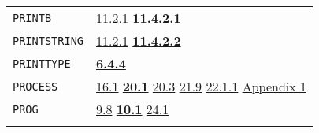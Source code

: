 \documentclass[a4paper]{scrbook}
\begin{document}
\begin{longtable}[]{@{}ll@{}}
\begin{minipage}[t]{0.24\columnwidth}\raggedright\strut
\texttt{PRINTB}\strut
\end{minipage} & \begin{minipage}[t]{0.70\columnwidth}\raggedright\strut
\href{11-input-output.md\#1121-open}{11.2.1} \textbf{\href{11-input-output.md\#11421-printb}{11.4.2.1}}\strut
\end{minipage}\tabularnewline
\begin{minipage}[t]{0.24\columnwidth}\raggedright\strut
\texttt{PRINTSTRING}\strut
\end{minipage} & \begin{minipage}[t]{0.70\columnwidth}\raggedright\strut
\href{11-input-output.md\#1121-open}{11.2.1} \textbf{\href{11-input-output.md\#11422-printstring}{11.4.2.2}}\strut
\end{minipage}\tabularnewline
\begin{minipage}[t]{0.24\columnwidth}\raggedright\strut
\texttt{PRINTTYPE}\strut
\end{minipage} & \begin{minipage}[t]{0.70\columnwidth}\raggedright\strut
\textbf{\href{06-data-types.md\#644-printtype-evaltype-and-applytype}{6.4.4}}\strut
\end{minipage}\tabularnewline
\begin{minipage}[t]{0.24\columnwidth}\raggedright\strut
\texttt{PROCESS}\strut
\end{minipage} & \begin{minipage}[t]{0.70\columnwidth}\raggedright\strut
\href{16-errors-frames-etc.md\#161-listen}{16.1} \textbf{\href{20-coroutines.md\#201-process-the-type}{20.1}}
\href{20-coroutines.md\#203-process-the-subr}{20.3} \href{21-interrupts.md\#219-user-defined-interrupts}{21.9}
\href{22-storage-management.md\#2211-stacks-and-other-internal-vectors}{22.1.1}
\href{appendix-1-a-look-inside.md\#basic-data-structures}{Appendix 1}\strut
\end{minipage}\tabularnewline
\begin{minipage}[t]{0.24\columnwidth}\raggedright\strut
\texttt{PROG}\strut
\end{minipage} & \begin{minipage}[t]{0.70\columnwidth}\raggedright\strut
\href{09-functions.md\#98-activation-name-act-again-and-return-1}{9.8}
\textbf{\href{10-looping.md\#101-prog-and-repeat-1}{10.1}}
\href{24-efficiency-and-tastefulness.md\#241-efficiency}{24.1}\strut
\end{minipage}\tabularnewline
\begin{minipage}[t]{0.24\columnwidth}\raggedright\strut

\end{minipage}
\end{longtable}
\end{document}
